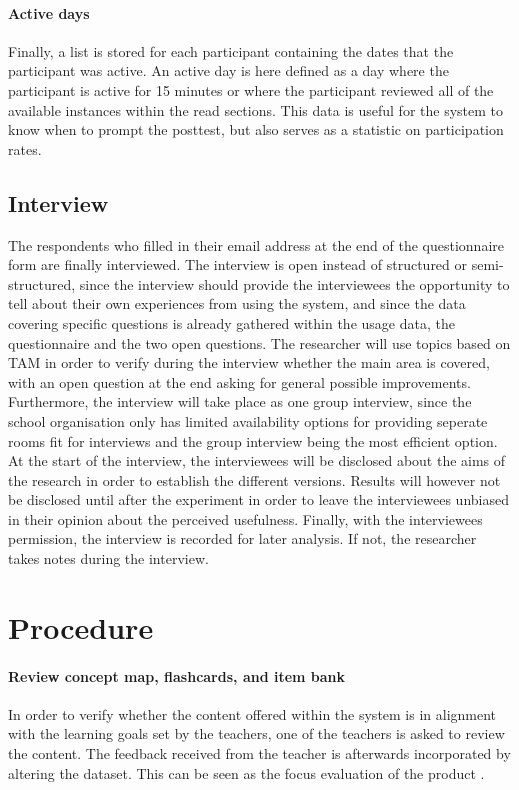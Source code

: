 \paragraph{Active days} Finally, a list is stored for each participant containing the dates that the participant was active. An active day is here defined as a day where the participant is active for 15 minutes or where the participant reviewed all of the available instances within the read sections. This data is useful for the system to know when to prompt the posttest, but also serves as a statistic on participation rates.

\subsection{Interview}

The respondents who filled in their email address at the end of the questionnaire form are finally interviewed. The interview is open instead of structured or semi-structured, since the interview should provide the interviewees the opportunity to tell about their own experiences from using the system, and since the data covering specific questions is already gathered within the usage data, the questionnaire and the two open questions. The researcher will use topics based on TAM in order to verify during the interview whether the main area is covered, with an open question at the end asking for general possible improvements. Furthermore, the interview will take place as one group interview, since the school organisation only has limited availability options for providing seperate rooms fit for interviews and the group interview being the most efficient option. At the start of the interview, the interviewees will be disclosed about the aims of the research in order to establish the different versions. Results will however not be disclosed until after the experiment in order to leave the interviewees unbiased in their opinion about the perceived usefulness. Finally, with the interviewees permission, the interview is recorded for later analysis. If not, the researcher takes notes during the interview.

\section{Procedure}
\label{sec:procedure}

\paragraph{Review concept map, flashcards, and item bank} In order to verify whether the content offered within the system is in alignment with the learning goals set by the teachers, one of the teachers is asked to review the content. The feedback received from the teacher is afterwards incorporated by altering the dataset. This can be seen as the focus evaluation of the product \cite{slo}.

